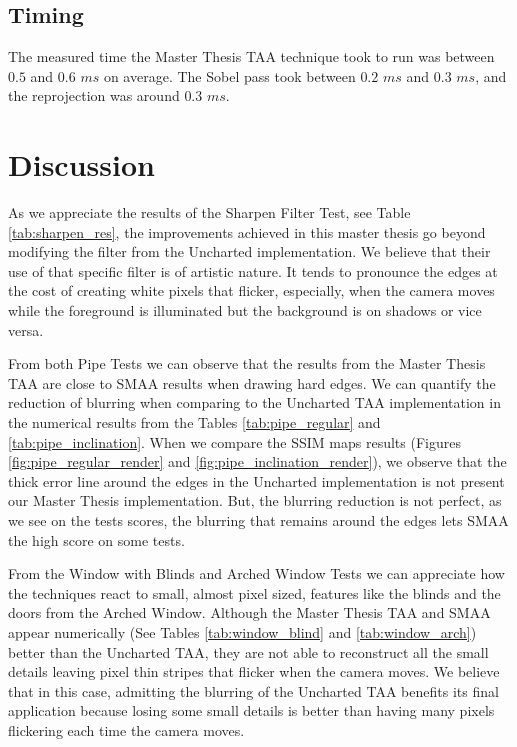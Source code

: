 \documentclass{cslthse-msc}
\begin{document}
\subsection{Timing} \label{result_timing}
The measured time the Master Thesis TAA technique took to run was between $0.5$ and $0.6$ $ms$ on average. The Sobel pass took between $0.2$ $ms$ and $0.3$ $ms$, and the reprojection was around $0.3$ $ms$.

\section{Discussion}
As we appreciate the results of the Sharpen Filter Test, see Table \ref{tab:sharpen_res}, the improvements achieved in this master thesis go beyond modifying the filter from the Uncharted implementation. We believe that their use of that specific filter is of artistic nature. It tends to pronounce the edges at the cost of creating white pixels that flicker, especially, when the camera moves while the foreground is illuminated but the background is on shadows or vice versa. 

From both Pipe Tests we can observe that the results from the Master Thesis TAA are close to SMAA results when drawing hard edges. We can quantify the reduction of blurring when comparing to the Uncharted TAA implementation in the numerical results from the Tables \ref{tab:pipe_regular} and \ref{tab:pipe_inclination}. When we compare the SSIM maps results (Figures \ref{fig:pipe_regular_render} and \ref{fig:pipe_inclination_render}), we observe that the thick error line around the edges in the Uncharted implementation is not present our Master Thesis implementation. But, the blurring reduction is not perfect, as we see on the tests scores, the blurring that remains around the edges lets SMAA the high score on some tests.

From the Window with Blinds and Arched Window Tests we can appreciate how the techniques react to small, almost pixel sized, features like the blinds and the doors from the Arched Window. Although the Master Thesis TAA and SMAA appear numerically (See Tables \ref{tab:window_blind} and \ref{tab:window_arch}) better than the Uncharted TAA, they are not able to reconstruct all the small details leaving pixel thin stripes that flicker when the camera moves. We believe that in this case, admitting the blurring of the Uncharted TAA benefits its final application because losing some small details is better than having many pixels flickering each time the camera moves.
\end{document}
